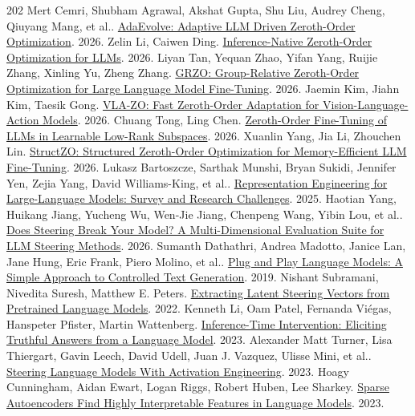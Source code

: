 \begin{thebibliography}{202}
 Mert Cemri, Shubham Agrawal, Akshat Gupta, Shu Liu, Audrey Cheng, Qiuyang Mang, et al.. \href{https://arxiv.org/abs/2602.20133v1}{AdaEvolve: Adaptive LLM Driven Zeroth-Order Optimization}. 2026.
 Zelin Li, Caiwen Ding. \href{https://arxiv.org/abs/2605.28760}{Inference-Native Zeroth-Order Optimization for LLMs}. 2026.
 Liyan Tan, Yequan Zhao, Yifan Yang, Ruijie Zhang, Xinling Yu, Zheng Zhang. \href{https://arxiv.org/abs/2606.02857v2}{GRZO: Group-Relative Zeroth-Order Optimization for Large Language Model Fine-Tuning}. 2026.
 Jaemin Kim, Jiahn Kim, Taesik Gong. \href{https://arxiv.org/abs/2610.06271v1}{VLA-ZO: Fast Zeroth-Order Adaptation for Vision-Language-Action Models}. 2026.
 Chuang Tong, Ling Chen. \href{https://arxiv.org/abs/2610.15225v1}{Zeroth-Order Fine-Tuning of LLMs in Learnable Low-Rank Subspaces}. 2026.
 Xuanlin Yang, Jia Li, Zhouchen Lin. \href{https://arxiv.org/abs/2610.16451v1}{StructZO: Structured Zeroth-Order Optimization for Memory-Efficient LLM Fine-Tuning}. 2026.
 Lukasz Bartoszcze, Sarthak Munshi, Bryan Sukidi, Jennifer Yen, Zejia Yang, David Williams-King, et al.. \href{https://arxiv.org/abs/2502.17601v1}{Representation Engineering for Large-Language Models: Survey and Research Challenges}. 2025.
 Haotian Yang, Huikang Jiang, Yucheng Wu, Wen-Jie Jiang, Chenpeng Wang, Yibin Lou, et al.. \href{https://arxiv.org/abs/2610.07722v1}{Does Steering Break Your Model? A Multi-Dimensional Evaluation Suite for LLM Steering Methods}. 2026.
 Sumanth Dathathri, Andrea Madotto, Janice Lan, Jane Hung, Eric Frank, Piero Molino, et al.. \href{https://arxiv.org/abs/1912.02164}{Plug and Play Language Models: A Simple Approach to Controlled Text Generation}. 2019.
 Nishant Subramani, Nivedita Suresh, Matthew E. Peters. \href{https://arxiv.org/abs/2205.05124v1}{Extracting Latent Steering Vectors from Pretrained Language Models}. 2022.
 Kenneth Li, Oam Patel, Fernanda Viégas, Hanspeter Pfister, Martin Wattenberg. \href{https://arxiv.org/abs/2306.03341}{Inference-Time Intervention: Eliciting Truthful Answers from a Language Model}. 2023.
 Alexander Matt Turner, Lisa Thiergart, Gavin Leech, David Udell, Juan J. Vazquez, Ulisse Mini, et al.. \href{https://arxiv.org/abs/2308.10248}{Steering Language Models With Activation Engineering}. 2023.
 Hoagy Cunningham, Aidan Ewart, Logan Riggs, Robert Huben, Lee Sharkey. \href{https://arxiv.org/abs/2309.08600v3}{Sparse Autoencoders Find Highly Interpretable Features in Language Models}. 2023.

\end{thebibliography}
